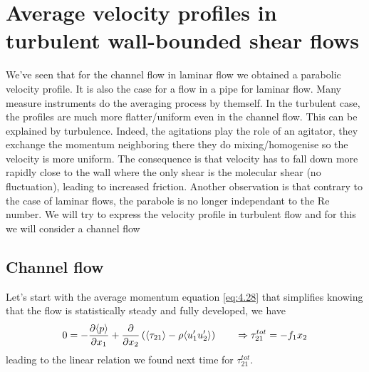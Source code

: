 \section{Average velocity profiles in turbulent wall-bounded shear flows}
	We've seen that for the channel flow in laminar flow we obtained a parabolic velocity profile. It is also the case for a flow in a pipe for laminar flow. Many measure instruments do the averaging process by themself. In the turbulent case, the profiles are much more flatter/uniform even in the channel flow. This can be explained by turbulence. Indeed, the agitations play the role of an agitator, they exchange the momentum neighboring there they do mixing/homogenise so the velocity is more uniform. The consequence is that velocity has to fall down more rapidly close to the wall where the only shear is the molecular shear (no fluctuation), leading to increased friction. Another observation is that contrary to the case of laminar flows, the parabole is no longer independant to the Re number. We will try to express the velocity profile in turbulent flow and for this we will consider a channel flow 
	
	\subsection{Channel flow}
		Let's start with the average momentum equation \eqref{eq:4.28} that simplifies knowing that the flow is statistically steady and fully developed, we have
		\begin{equation}
			0 = -\frac{\partial \langle p \rangle}{\partial x_1} + \frac{\partial}{\partial x_2} \left( \langle \tau _{21}\rangle - \rho \langle u_1' u_2' \rangle\right)\qquad \Rightarrow \tau _{21}^{tot} = -f_1 x_2
		\end{equation}
		leading to the linear relation we found next time for $\tau _{21}^{tot}$. 
		
